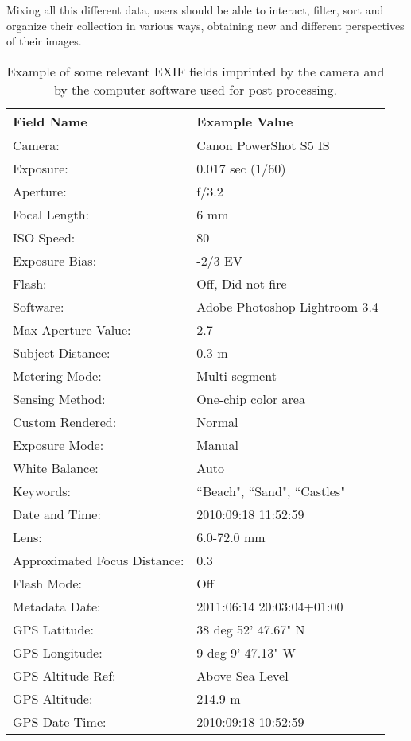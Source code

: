 Mixing all this different data, users should be able to interact, filter, sort and organize their collection in various ways, obtaining new and different perspectives of their images.

\begin{table}[h]
\vspace{\baselineskip}
\renewcommand{\arraystretch}{1.4}
\centering
\vspace{0.2cm}
	\begin{tabular}{ll}
	\textbf{Field Name}			&	\textbf{Example Value}\\
	\hline
	Camera:				&	Canon PowerShot S5 IS\\
	Exposure:			&	0.017 sec (1/60)\\
	Aperture:			&	f/3.2\\
	Focal Length:		&	6 mm\\
	ISO Speed:			&	80\\
	Exposure Bias:		&	-2/3 EV\\
	Flash:				&	Off, Did not fire\\
	Software:			&	Adobe Photoshop Lightroom 3.4\\
	Max Aperture Value:	&	2.7\\
	Subject Distance:	&	0.3 m\\
	Metering Mode:		&	Multi-segment\\
	Sensing Method:		&	One-chip color area\\
	Custom Rendered:	&	Normal\\
	Exposure Mode:		&	Manual\\
	White Balance:		&	Auto\\
	Keywords:			&	``Beach", ``Sand", ``Castles"\\
	Date and Time:		&	2010:09:18 11:52:59\\
	Lens:				&	6.0-72.0 mm\\
	Approximated Focus Distance:	&	0.3\\
	Flash Mode:			&	Off\\
	Metadata Date:		&	2011:06:14 20:03:04+01:00\\
	GPS Latitude: 		&	38 deg 52' 47.67" N\\
	GPS Longitude: 		&	9 deg 9' 47.13" W\\
	GPS Altitude Ref: 	&	Above Sea Level\\
	GPS Altitude: 		&	214.9 m\\
	GPS Date Time:		&	2010:09:18 10:52:59\\
\end{tabular}
\caption{Example of some relevant EXIF fields imprinted by the camera and by the computer software used for post processing.}
\label{tab:exif}
\end{table}



